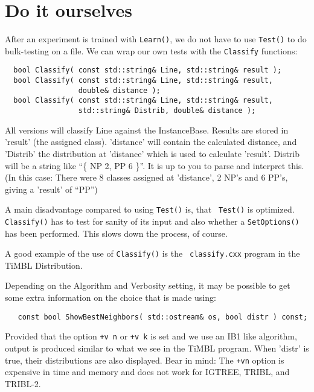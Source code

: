 \section{Do it ourselves}

After an experiment is trained with {\tt Learn()}, we do not have to use
{\tt Test()} to do bulk-testing on a file.
We can wrap our own tests with the {\tt Classify} functions:

\begin{footnotesize}
\begin{verbatim}
  bool Classify( const std::string& Line, std::string& result );
  bool Classify( const std::string& Line, std::string& result, 
                 double& distance );
  bool Classify( const std::string& Line, std::string& result,
                 std::string& Distrib, double& distance );
\end{verbatim}
\end{footnotesize}

All versions will classify Line against the InstanceBase. Results are
stored in 'result' (the assigned class). 'distance' will contain the
calculated distance, and 'Distrib' the distribution at 'distance'
which is used to calculate 'result'.  Distrib will be a string like
``\{ NP 2, PP 6 \}''. It is up to you to parse and interpret this. (In
this case: There were 8 classes assigned at 'distance', 2 NP's and 6
PP's, giving a 'result' of ``PP'')

A main disadvantage compared to using {\tt Test()} is, that {\tt
  Test()} is optimized.  {\tt Classify()} has to test for sanity of
its input and also whether a {\tt SetOptions()} has been
performed. This slows down the process, of course.

A good example of the use of {\tt Classify()} is the {\tt
  classify.cxx} program in the TiMBL Distribution.

Depending on the Algorithm and Verbosity setting, it may be possible
to get some extra information on the choice that is made using:

\begin{footnotesize}
\begin{verbatim}
   const bool ShowBestNeighbors( std::ostream& os, bool distr ) const;
\end{verbatim}
\end{footnotesize}

Provided that the option {\tt +v n} or {\tt +v k} is set and we use an IB1 like
algorithm, output is produced similar to what we see in the TiMBL program.
When 'distr' is true, their distributions are also displayed.
Bear in mind: The {\tt +vn} option is expensive in time and memory and
does not work for IGTREE, TRIBL, and TRIBL-2.

